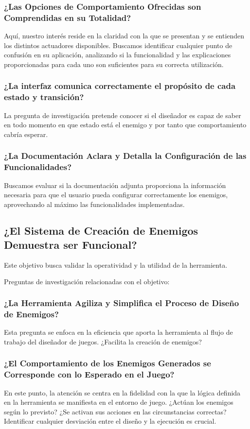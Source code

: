\subsubsection{¿Las Opciones de Comportamiento Ofrecidas son Comprendidas en su Totalidad?}
Aquí, nuestro interés reside en la claridad con la que se presentan y se entienden los distintos actuadores disponibles. Buscamos identificar cualquier punto de confusión en su aplicación, analizando si la funcionalidad y las explicaciones proporcionadas para cada uno son suficientes para su correcta utilización.
\subsubsection{¿La interfaz comunica correctamente el propósito de cada estado y transición?}
La pregunta de investigación pretende conocer si el diseñador es capaz de saber en todo momento en que estado está el enemigo y por tanto que comportamiento cabría esperar.
\subsubsection{¿La Documentación Aclara y Detalla la Configuración de las Funcionalidades?}
Buscamos evaluar si la documentación adjunta proporciona la información necesaria para que el usuario pueda configurar correctamente los enemigos, aprovechando al máximo las funcionalidades implementadas. 


\subsection{¿El Sistema de Creación de Enemigos Demuestra ser Funcional?}
Este objetivo busca validar la operatividad y la utilidad de la herramienta.

Preguntas de investigación relacionadas con el objetivo:


\subsubsection{¿La Herramienta Agiliza y Simplifica el Proceso de Diseño de Enemigos?}
Esta pregunta se enfoca en la eficiencia que aporta la herramienta al flujo de trabajo del diseñador de juegos. ¿Facilita la creación de enemigos?
\subsubsection{¿El Comportamiento de los Enemigos Generados se Corresponde con lo Esperado en el Juego?}
En este punto, la atención se centra en la fidelidad con la que la lógica definida en la herramienta se manifiesta en el entorno de juego. ¿Actúan los enemigos según lo previsto? ¿Se activan sus acciones en las circunstancias correctas? Identificar cualquier desviación entre el diseño y la ejecución es crucial.
